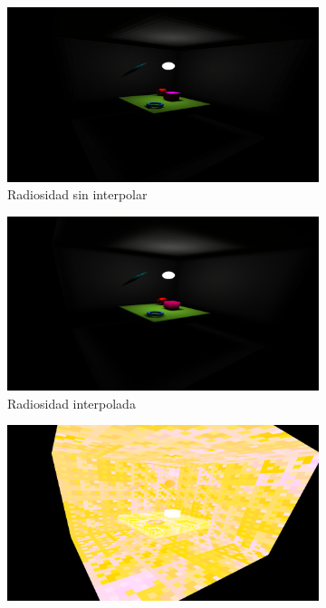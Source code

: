 \begin{figure}[htbp!]
	\centering
		\begin{subfigure}{0.4\textwidth}
		\includegraphics[width=1\linewidth]{assets/display-view(3)}
		\caption{Radiosidad sin interpolar}
	\end{subfigure}
	\begin{subfigure}{0.4\textwidth}
		\includegraphics[width=1\linewidth]{assets/display-view(4)}
		\caption{Radiosidad interpolada}
	\end{subfigure}
	\begin{subfigure}{0.4\textwidth}
		\includegraphics[width=1\linewidth]{assets/display-view(1)}

\end{subfigure}
\end{figure}

